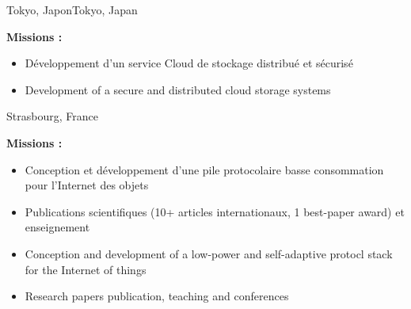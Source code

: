 \vspace{\ItemsSpacing}

{}{}{\ifnativelang Tokyo, Japon\else Tokyo, Japan\fi}{
\textbf{Missions :} 
\begin{itemize}
\ifnativelang
\item D\'eveloppement d'un service Cloud de stockage distribu\'e et s\'ecuris\'e
\else
\item Development of a secure and distributed cloud storage systems
\fi
\end{itemize}
}

\vspace{\ItemsSpacing}

{}{}{Strasbourg, France}{
\textbf{Missions :} 
\begin{itemize}
\ifnativelang
\item Conception et d\'eveloppement d'une pile protocolaire basse consommation pour l'Internet des objets
\item Publications scientifiques (10+ articles internationaux, 1 best-paper award) et enseignement
\else
\item Conception and development of a low-power and self-adaptive protocl stack for the Internet of things
\item Research papers publication, teaching and conferences
\fi
\end{itemize}
}


